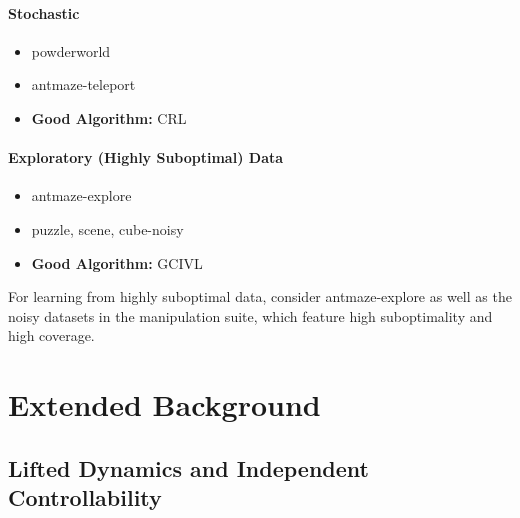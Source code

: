 \documentclass{article}
\theoremstyle{plain}
\theoremstyle{definition}
\theoremstyle{remark}
\begin{document}
\paragraph{Stochastic}
\begin{itemize}
    \item powderworld
    \item antmaze-teleport
    \item \textbf{Good Algorithm:} CRL
\end{itemize}

\paragraph{Exploratory (Highly Suboptimal) Data}
\begin{itemize}
    \item antmaze-explore
    \item {puzzle, scene, cube}-noisy
    \item \textbf{Good Algorithm:} GCIVL
\end{itemize}
For learning from highly suboptimal data, consider antmaze-explore as well as the noisy datasets in the manipulation suite, which feature high suboptimality and high coverage.

\section{Extended Background}
\subsection{Lifted Dynamics and Independent Controllability}
\end{document}
